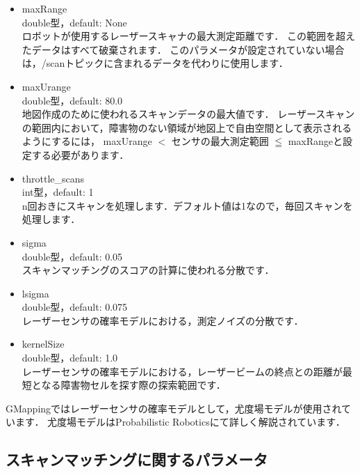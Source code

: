\documentclass[{../../master}]{subfiles}
\begin{document}
\begin{itemize}
  \item \textsf{maxRange} \\
    double型，default: None\\
    ロボットが使用するレーザースキャナの最大測定距離です．
    この範囲を超えたデータはすべて破棄されます．
    このパラメータが設定されていない場合は，\textsf{/scan}トピックに含まれるデータを代わりに使用します．
  \item \textsf{maxUrange} \\
    double型，default: 80.0 \\
    地図作成のために使われるスキャンデータの最大値です．
    レーザースキャンの範囲内において，障害物のない領域が地図上で自由空間として表示されるようにするには，
    \textsf{maxUrange} $<$ センサの最大測定範囲 $\leqq$ \textsf{maxRange}と設定する必要があります．
  \item \textsf{throttle\_scans} \\
    int型，default: 1 \\
    n回おきにスキャンを処理します．デフォルト値は1なので，毎回スキャンを処理します．
  \item \textsf{sigma} \\
    double型，default: 0.05 \\
    スキャンマッチングのスコアの計算に使われる分散です．
  \item \textsf{lsigma} \\
    double型，default: 0.075 \\
    レーザーセンサの確率モデルにおける，測定ノイズの分散です．
  \item \textsf{kernelSize} \\
    double型，default: 1.0 \\
    レーザーセンサの確率モデルにおける，レーザービームの終点との距離が最短となる障害物セルを探す際の探索範囲です．
\end{itemize}

GMappingではレーザーセンサの確率モデルとして，尤度場モデルが使用されています．
尤度場モデルはProbabilistic Robotics\cite{thrun2005probabilistic}にて詳しく解説されています．

\subsection{スキャンマッチングに関するパラメータ}
\end{document}
